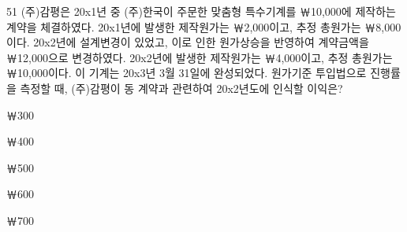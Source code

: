 \begin{question}{51}
(주)감평은 20x1년 중 (주)한국이 주문한 맞춤형 특수기계를 ￦10,000에 제작하는 계약을 체결하였다. 20x1년에 발생한 제작원가는 ￦2,000이고, 추정 총원가는 ￦8,000이다. 20x2년에 설계변경이 있었고, 이로 인한 원가상승을 반영하여 계약금액을 ￦12,000으로 변경하였다. 20x2년에 발생한 제작원가는 ￦4,000이고, 추정 총원가는 ￦10,000이다. 이 기계는 20x3년 3월 31일에 완성되었다. 원가기준 투입법으로 진행률을 측정할 때, (주)감평이 동 계약과 관련하여 20x2년도에 인식할 이익은?
\begin{choices}
  \item ￦300
  \item ￦400
  \item ￦500
  \item ￦600
  \item ￦700
\end{choices}
\end{question}
